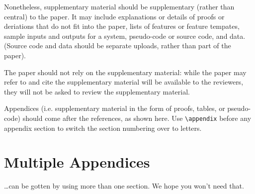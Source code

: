 \documentclass[11pt]{article}
\begin{document}
Nonetheless, supplementary material should be supplementary (rather
than central) to the paper. It may include explanations or details
of proofs or deriations that do not fit into the paper, lists of
features or feature tempates, sample inputs and outputs for a system,
pseudo-code or source code, and data. (Source code and data should
be separate uploads, rather than part of the paper).

The paper should not rely on the supplementary material: while the paper
may refer to and cite the supplementary material will be available to the
reviewers, they will not be asked to review the
supplementary material.

Appendices (i.e. supplementary material in the form of proofs, tables,
or pseudo-code) should come after the references, as shown here. Use
\verb|\appendix| before any appendix section to switch the section
numbering over to letters.

\section{Multiple Appendices}
\dots can be gotten by using more than one section. We hope you won't
need that.
\end{document}
